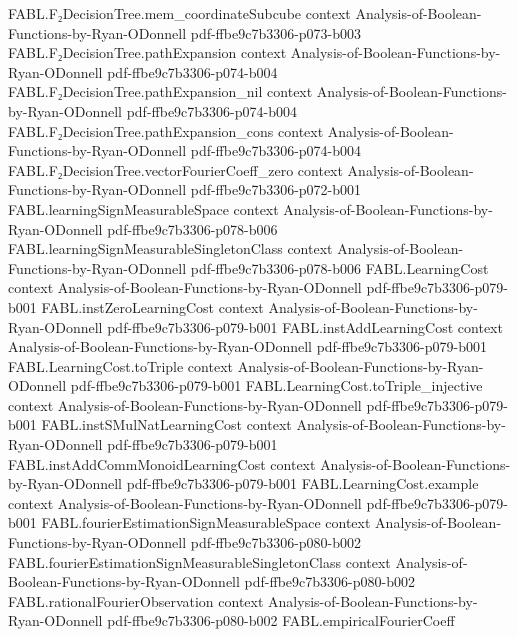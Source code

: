 \begin{theorem}
  {FABL.F₂DecisionTree.mem_coordinateSubcube}
  {context}
  {Analysis-of-Boolean-Functions-by-Ryan-ODonnell}
  {pdf-ffbe9c7b3306-p073-b003}
\proofstep
  {FABL.F₂DecisionTree.pathExpansion}
  {context}
  {Analysis-of-Boolean-Functions-by-Ryan-ODonnell}
  {pdf-ffbe9c7b3306-p074-b004}
\proofstep
  {FABL.F₂DecisionTree.pathExpansion_nil}
  {context}
  {Analysis-of-Boolean-Functions-by-Ryan-ODonnell}
  {pdf-ffbe9c7b3306-p074-b004}
\proofstep
  {FABL.F₂DecisionTree.pathExpansion_cons}
  {context}
  {Analysis-of-Boolean-Functions-by-Ryan-ODonnell}
  {pdf-ffbe9c7b3306-p074-b004}
\proofstep
  {FABL.F₂DecisionTree.vectorFourierCoeff_zero}
  {context}
  {Analysis-of-Boolean-Functions-by-Ryan-ODonnell}
  {pdf-ffbe9c7b3306-p072-b001}
\proofstep
  {FABL.learningSignMeasurableSpace}
  {context}
  {Analysis-of-Boolean-Functions-by-Ryan-ODonnell}
  {pdf-ffbe9c7b3306-p078-b006}
\proofstep
  {FABL.learningSignMeasurableSingletonClass}
  {context}
  {Analysis-of-Boolean-Functions-by-Ryan-ODonnell}
  {pdf-ffbe9c7b3306-p078-b006}
\proofstep
  {FABL.LearningCost}
  {context}
  {Analysis-of-Boolean-Functions-by-Ryan-ODonnell}
  {pdf-ffbe9c7b3306-p079-b001}
\proofstep
  {FABL.instZeroLearningCost}
  {context}
  {Analysis-of-Boolean-Functions-by-Ryan-ODonnell}
  {pdf-ffbe9c7b3306-p079-b001}
\proofstep
  {FABL.instAddLearningCost}
  {context}
  {Analysis-of-Boolean-Functions-by-Ryan-ODonnell}
  {pdf-ffbe9c7b3306-p079-b001}
\proofstep
  {FABL.LearningCost.toTriple}
  {context}
  {Analysis-of-Boolean-Functions-by-Ryan-ODonnell}
  {pdf-ffbe9c7b3306-p079-b001}
\proofstep
  {FABL.LearningCost.toTriple_injective}
  {context}
  {Analysis-of-Boolean-Functions-by-Ryan-ODonnell}
  {pdf-ffbe9c7b3306-p079-b001}
\proofstep
  {FABL.instSMulNatLearningCost}
  {context}
  {Analysis-of-Boolean-Functions-by-Ryan-ODonnell}
  {pdf-ffbe9c7b3306-p079-b001}
\proofstep
  {FABL.instAddCommMonoidLearningCost}
  {context}
  {Analysis-of-Boolean-Functions-by-Ryan-ODonnell}
  {pdf-ffbe9c7b3306-p079-b001}
\proofstep
  {FABL.LearningCost.example}
  {context}
  {Analysis-of-Boolean-Functions-by-Ryan-ODonnell}
  {pdf-ffbe9c7b3306-p079-b001}
\proofstep
  {FABL.fourierEstimationSignMeasurableSpace}
  {context}
  {Analysis-of-Boolean-Functions-by-Ryan-ODonnell}
  {pdf-ffbe9c7b3306-p080-b002}
\proofstep
  {FABL.fourierEstimationSignMeasurableSingletonClass}
  {context}
  {Analysis-of-Boolean-Functions-by-Ryan-ODonnell}
  {pdf-ffbe9c7b3306-p080-b002}
\proofstep
  {FABL.rationalFourierObservation}
  {context}
  {Analysis-of-Boolean-Functions-by-Ryan-ODonnell}
  {pdf-ffbe9c7b3306-p080-b002}
\proofstep
  {FABL.empiricalFourierCoeff}

\end{theorem}
